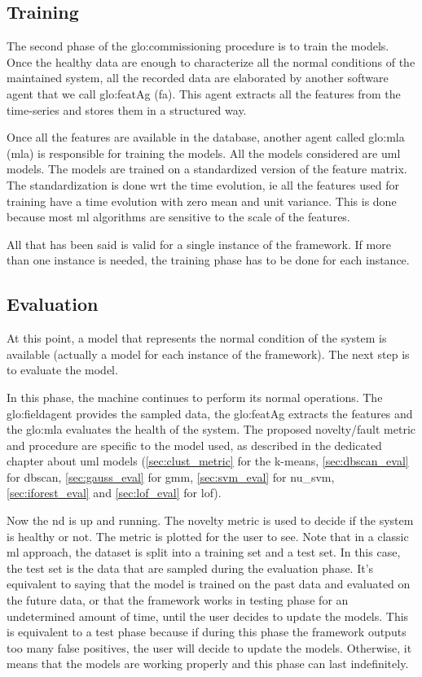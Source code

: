 \subsection{Training}
The second phase of the \gls{glo:commissioning} procedure is to train the models. Once the healthy data are enough to characterize all the normal conditions of the maintained system, all the recorded data are elaborated by another software agent that we call \gls{glo:featAg} (\gls{fa}). This agent extracts all the features from the time-series and stores them in a structured way.

Once all the features are available in the database, another agent called \gls{glo:mla} (\gls{mla}) is responsible for training the models. All the models considered are \gls{uml} models. The models are trained on a standardized version of the feature matrix. The standardization is done \gls{wrt} the time evolution, \gls{ie} all the features used for training have a time evolution with zero mean and unit variance. This is done because most \gls{ml} algorithms are sensitive to the scale of the features.

All that has been said is valid for a single instance of the framework. If more than one instance is needed, the training phase has to be done for each instance.

\subsection{Evaluation}
At this point, a model that represents the normal condition of the system is available (actually a model for each instance of the framework). The next step is to evaluate the model.

In this phase, the machine continues to perform its normal operations. The \gls{glo:fieldagent} provides the sampled data, the \gls{glo:featAg} extracts the features and the \gls{glo:mla} evaluates the health of the system.
The proposed novelty/fault metric and procedure are specific to the model used, as described in the dedicated chapter about \gls{uml} models (\autoref{sec:clust_metric} for the k-means, \autoref{sec:dbscan_eval} for \gls{dbscan}, \autoref{sec:gauss_eval} for \gls{gmm}, \autoref{sec:svm_eval} for \gls{nu_svm}, \autoref{sec:iforest_eval} and \autoref{sec:lof_eval} for \gls{lof}). 

Now the \gls{nd} is up and running. The novelty metric is used to decide if the system is healthy or not. The metric is plotted for the user to see.
Note that in a classic \gls{ml} approach, the dataset is split into a training set and a test set. In this case, the test set is the data that are sampled during the evaluation phase. It's equivalent to saying that the model is trained on the past data and evaluated on the future data, or that the framework works in testing phase for an undetermined amount of time, until the user decides to update the models. This is equivalent to a test phase because if during this phase the framework outputs too many false positives, the user will decide to update the models. Otherwise, it means that the models are working properly and this phase can last indefinitely.

